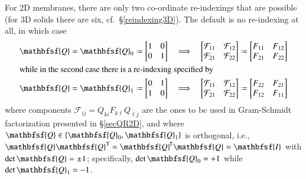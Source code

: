 For 2D membranes, there are only two co-ordinate re-indexings that are possible (for 3D solids there are six, cf.\ \S\ref{reindexing3D}).  The default is no re-indexing at all, in which case 
\begin{subequations}
	\label{membraneRelabling}
	\begin{align}
	\mathbfsf{Q} = \mathbfsf{Q}_0 & \defeq 
	\begin{bmatrix} 1 & 0 \\ 0 & 1 \end{bmatrix} & 
	\implies & & \begin{bmatrix}
	\mathcal{F}_{11} & \mathcal{F}_{12} \\
	\mathcal{F}_{21} & \mathcal{F}_{22}
	\end{bmatrix} & \defeq \begin{bmatrix}
	F_{11} & F_{12} \\
	F_{21} & F_{22}
	\end{bmatrix} \label{Q0} \\
	\intertext{while in the second case there is a re-indexing specified by}
	\mathbfsf{Q} = \mathbfsf{Q}_1 & \defeq 
	\begin{bmatrix} 0 & 1 \\ 1 & 0 \end{bmatrix} & 
	\implies & & \begin{bmatrix}
	\mathcal{F}_{11} & \mathcal{F}_{12} \\
	\mathcal{F}_{21} & \mathcal{F}_{22}
	\end{bmatrix} & \defeq \begin{bmatrix}
	F_{22} & F_{21} \\
	F_{12} & F_{11}
	\end{bmatrix}
	\label{Q1}
	\end{align}
\end{subequations}
where components $\mathcal{F}_{ij} = Q_{ki} F_{k\ell} Q_{\ell j}$ are the ones to be used in Gram-Schmidt factorization presented in \S\ref{secQR2D}, and where $\mathbfsf{Q} \in \{ \mathbfsf{Q}_0 , \mathbfsf{Q}_1 \}$ is orthogonal, i.e., $\mathbfsf{Q} \mathbfsf{Q}^{\mathsf{T}} = \mathbfsf{Q}^{\hspace{-1pt}\mathsf{T}} \mathbfsf{Q} = \mathbfsf{I}$ with $\det \mathbfsf{Q} = \pm 1$; specifically, $\det \mathbfsf{Q}_0 = +1$ while $\det \mathbfsf{Q}_1 = -1$.

